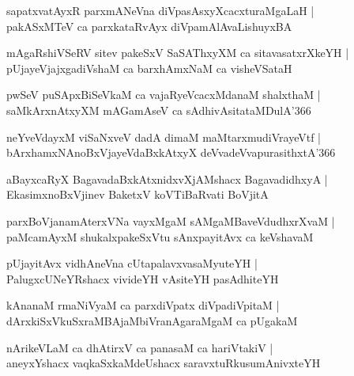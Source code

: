 \documentclass[twoside,12pt,openright]{book}
\newcounter{shloka}[chapter]
\begin{document}
\begin{shloka}%
sapatxvatAyxR parxmANeVna diVpasAsxyXcacxturaMgaLaH |\\
pakASxMTeV ca parxkataRvAyx diVpamAlAvaLishuyxBA 
\end{shloka}

\begin{shloka}%
mAgaRshiVSeRV sitev pakeSxV SaSAThxyXM ca sitavasatxrXkeYH |\\
pUjayeVjajxgadiVshaM ca barxhAmxNaM ca visheVSataH
\end{shloka}

\begin{shloka}%
pwSeV puSApxBiSeVkaM ca vajaRyeVcacxMdanaM shalxthaM |\\
saMkArxnAtxyXM mAGamAseV ca sAdhivAsitataMDulA\char'366
\end{shloka}

\begin{shloka}%
neYveVdayxM viSaNxveV dadA dimaM maMtarxmudiVrayeVtf |\\
bArxhamxNAnoBxVjayeVdaBxkAtxyX deVvadeVvapurasithxtA\char'366
\end{shloka}

\begin{shloka}%
aBayxcaRyX BagavadaBxkAtxnidxvXjAMshacx BagavadidhxyA |\\
EkasimxnoBxVjinev BaketxV koVTiBaRvati BoVjitA 
\end{shloka}

\begin{shloka}%
parxBoVjanamAterxVNa vayxMgaM sAMgaMBaveVdudhxrXvaM |\\
paMcamAyxM shukalxpakeSxVtu sAnxpayitAvx ca keVshavaM 
\end{shloka}

\begin{shloka}%
pUjayitAvx vidhAneVna cUtapalavxvasaMyuteYH |\\
PalugxcUNeYRshacx vivideYH vAsiteYH pasAdhiteYH
\end{shloka}

\begin{shloka}%
kAnanaM rmaNiVyaM ca parxdiVpatx diVpadiVpitaM |\\
dArxkiSxVkuSxraMBAjaMbiVranAgaraMgaM ca pUgakaM 
\end{shloka}

\begin{shloka}%
nArikeVLaM ca dhAtirxV ca panasaM ca hariVtakiV |\\
aneyxYshacx vaqkaSxkaMdeUshacx saravxtuRkusumAnivxteYH
\end{shloka}
\end{document}
